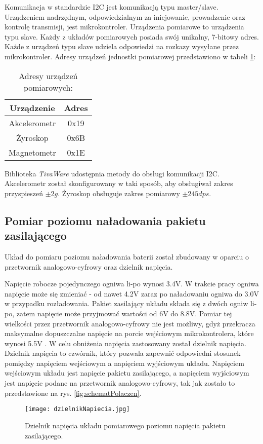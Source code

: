 Komunikacja w standardzie I2C jest komunikacją typu master/slave. Urządzeniem nadrzędnym, odpowiedzialnym za inicjowanie, prowadzenie oraz kontrolę transmisji, jest mikrokontroler. Urządzenia pomiarowe to urządzenia typu slave. Każdy z układów pomiarowych posiada swój unikalny, 7-bitowy adres. Każde z urządzeń typu slave udziela odpowiedzi na rozkazy wysyłane przez mikrokontroler. Adresy urządzeń jednostki pomiarowej przedstawiono w tabeli \ref{tab:adresyImu}:

\begin{table}[h]
    \caption{Adresy urządzeń pomiarowych:}
    \begin{center}
		\label{tab:adresyImu}
		\begin{tabular}{|c|c|}
			\hline
 			\textbf{Urządzenie} & \textbf{Adres} \\
 			\hline
 			Akcelerometr & 0x19 \\  
 			\hline
			Żyroskop & 0x6B \\
			\hline
			Magnetometr & 0x1E \\  
			\hline
		\end{tabular}
	\end{center}
\end{table}

Biblioteka \textit{TivaWare} udostępnia metody do obsługi komunikacji I2C. Akcelerometr został skonfigurowany w taki sposób, aby obsługiwał zakres przyspieszeń $\pm2g$. Żyroskop obsługuje zakres pomiarowy $\pm245dps$.
\subsection{Pomiar poziomu naładowania pakietu zasilającego}

Układ do pomiaru poziomu naładowania baterii został zbudowany w oparciu o przetwornik analogowo-cyfrowy oraz dzielnik napięcia. 

Napięcie robocze pojedynczego ogniwa li-po wynosi 3.4V. W trakcie pracy ogniwa napięcie może się zmieniać - od nawet 4.2V zaraz po naładowaniu ogniwa do 3.0V w przypadku rozładowania. Pakiet zasilający układu składa się z dwóch ogniw li-po, zatem napięcie może przyjmować wartości od 6V do 8.8V. Pomiar tej wielkości przez przetwornik analogowo-cyfrowy nie jest możliwy, gdyż przekracza maksymalne dopuszczalne napięcie na porcie wejściowym mikrokontrolera, które wynosi 5.5V \cite{tiva}. W celu obniżenia napięcia zastosowany został dzielnik napięcia. Dzielnik napięcia to czwórnik, który pozwala zapewnić odpowiedni stosunek pomiędzy napięciem wejściowym a napięciem wyjściowym układu. Napięciem wejściowym układu jest napięcie pakietu zasilającego, a napięciem wyjściowym jest napięcie podane na przetwornik analogowo-cyfrowy, tak jak zostało to przedstawione na rys. \ref{fig:schematPolaczen}.
\begin{figure}[h]
    \centering
    \texttt{[image: dzielnikNapiecia.jpg]}
    \caption{Dzielnik napięcia układu pomiarowego poziomu napięcia pakietu zasilającego.}
    \label{fig:równia}
\end{figure}

